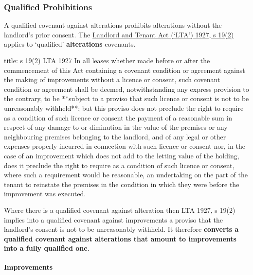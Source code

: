 \documentclass[
]{article}
\newenvironment{Shaded}{}{}
\newcommand{\NormalTok}[1]{#1}
\begin{document}
\hypertarget{qualified-prohibitions}{%
\subsubsection{Qualified Prohibitions}\label{qualified-prohibitions}}

A qualified covenant against alterations prohibits alterations without
the landlord's prior consent. The
\href{https://www.legislation.gov.uk/ukpga/Geo5/17-18/36/section/19}{Landlord
and Tenant Act (`LTA') 1927, s 19(2)} applies to `qualified'
\textbf{alterations} covenants.

\begin{Shaded}
\begin{Highlighting}[]
\NormalTok{title: s 19(2) LTA 1927}
\NormalTok{In all leases whether made before or after the commencement of this Act containing a covenant condition or agreement against the making of improvements without a licence or consent, such covenant condition or agreement shall be deemed, notwithstanding any express provision to the contrary, to be **subject to a proviso that such licence or consent is not to be unreasonably withheld**; but this proviso does not preclude the right to require as a condition of such licence or consent the payment of a reasonable sum in respect of any damage to or diminution in the value of the premises or any neighbouring premises belonging to the landlord, and of any legal or other expenses properly incurred in connection with such licence or consent nor, in the case of an improvement which does not add to the letting value of the holding, does it preclude the right to require as a condition of such licence or consent, where such a requirement would be reasonable, an undertaking on the part of the tenant to reinstate the premises in the condition in which they were before the improvement was executed.}
\end{Highlighting}
\end{Shaded}

Where there is a qualified covenant against alteration then LTA 1927, s
19(2) implies into a qualified covenant against improvements a proviso
that the landlord's consent is not to be unreasonably withheld. It
therefore \textbf{converts a qualified covenant against alterations that
amount to improvements into a fully qualified one}.

\hypertarget{improvements}{%
\paragraph{Improvements}\label{improvements}}
\end{document}

